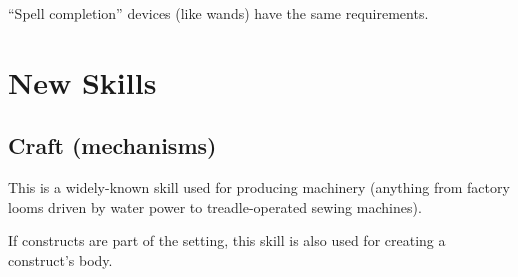 ``Spell completion'' devices (like wands) have the same requirements.
%

%
%
\section{New Skills}

%
\subsection{Craft (mechanisms)}

This is a widely-known skill used for producing machinery (anything from
factory looms driven by water power to treadle-operated sewing machines).

If constructs are part of the setting, this skill is also used for
creating a construct's body.
%

%
